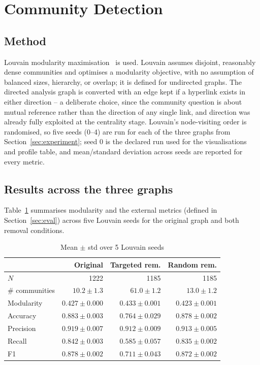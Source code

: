 \documentclass[10pt,twocolumn]{article}
\begin{document}
\section{Community Detection}
\label{sec:community}

\subsection{Method}
Louvain modularity maximisation~\cite{blondel2008} is used. Louvain assumes disjoint, reasonably
dense communities and optimises a modularity objective, with no assumption of balanced sizes,
hierarchy, or overlap; it is defined for undirected graphs. The directed analysis graph is converted
with an edge kept if a hyperlink exists in either direction -- a deliberate choice, since the
community question is about mutual reference rather than the direction of any single link, and
direction was already fully exploited at the centrality stage. Louvain's node-visiting order is
randomised, so five seeds (0--4) are run for each of the three graphs from Section~\ref{sec:experiment};
seed 0 is the declared run used for the visualisations and profile table, and mean/standard
deviation across seeds are reported for every metric.

\subsection{Results across the three graphs}
Table~\ref{tab:summary} summarises modularity and the external metrics (defined in
Section~\ref{sec:eval}) across five Louvain seeds for the original graph and both removal
conditions.

\begin{table}[h]
\centering
\caption{Mean $\pm$ std over 5 Louvain seeds}
\label{tab:summary}
\small
\begin{tabular}{@{}lrrr@{}}
\toprule
 & Original & Targeted rem. & Random rem. \\
\midrule
$N$ & 1222 & 1185 & 1185 \\
\# communities & $10.2\pm1.3$ & $61.0\pm1.2$ & $13.0\pm1.2$ \\
Modularity & $0.427\pm0.000$ & $0.433\pm0.001$ & $0.423\pm0.001$ \\
Accuracy & $0.883\pm0.003$ & $0.764\pm0.029$ & $0.878\pm0.002$ \\
Precision & $0.919\pm0.007$ & $0.912\pm0.009$ & $0.913\pm0.005$ \\
Recall & $0.842\pm0.003$ & $0.585\pm0.057$ & $0.835\pm0.002$ \\
F1 & $0.878\pm0.002$ & $0.711\pm0.043$ & $0.872\pm0.002$ \\
\bottomrule
\end{tabular}
\end{table}
\end{document}

